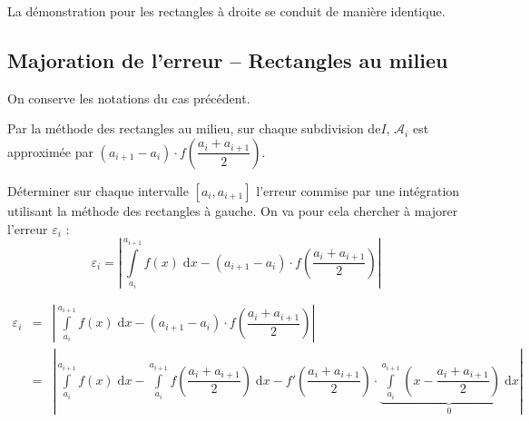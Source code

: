 \documentclass[10pt]{article}
\begin{document}
\begin{rem}
La démonstration pour les rectangles à droite se conduit de manière identique. 
\end{rem}

\subsection{Majoration de l'erreur -- Rectangles au milieu}
On conserve les notations du cas précédent.

 Par la méthode des rectangles au milieu, sur chaque subdivision de$I$, $\mathcal{A}_i$ est approximée par $\left(a_{i+1}-a_{i}\right) \cdot f\left(\dfrac{a_i+a_{i+1}}{2}\right) $. 

\begin{Objectif}
Déterminer sur chaque intervalle $[a_i,a_{i+1}]$ l'erreur commise par une intégration utilisant la méthode des rectangles à gauche. On va pour cela chercher à majorer l'erreur $\varepsilon_i$ :
$$
\varepsilon_i = \left| \int\limits_{a_i}^{a_{i+1}}f(x)\;\mathrm{d}x -
\left(a_{i+1}-a_{i}\right) \cdot f\left(\dfrac{a_i+a_{i+1}}{2}\right)\right|
$$
\end{Objectif}

\begin{eqnarray*}
\varepsilon_i & = &\left| \int\limits_{a_i}^{a_{i+1}}f(x)\;\mathrm{d}x -
\left(a_{i+1}-a_{i}\right) \cdot f\left(\dfrac{a_i+a_{i+1}}{2}\right)\right| \\
 & = &  \left|\int\limits_{a_i}^{a_{i+1}}f(x)\;\mathrm{d}x 
 - \int\limits_{a_i}^{a_{i+1}}f\left(\dfrac{a_i+a_{i+1}}{2}\right)\;\mathrm{d}x 
 - f'\left(\dfrac{a_i+a_{i+1}}{2}\right) 
 \cdot \underbrace{\int\limits_{a_i}^{a_{i+1}} \left( x - \dfrac{a_i+a_{i+1}}{2}\right)\;\mathrm{d}x}_{0} \right|\\%
\end{eqnarray*}
\end{document}
